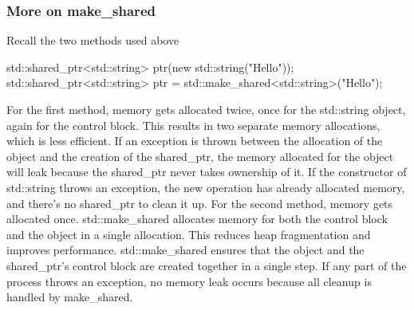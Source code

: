 \documentclass{report}
\begin{document}
\bigbreak \noindent 
\subsubsection{More on make\_shared}
\bigbreak \noindent 
Recall the two methods used above 
\bigbreak \noindent 
\begin{cppcode}
std::shared_ptr<std::string> ptr(new std::string("Hello"));
std::shared_ptr<std::string> ptr = std::make_shared<std::string>("Hello");
\end{cppcode}
\bigbreak \noindent 
For the first method, memory gets allocated twice, once for the std::string object, again for the control block. This results in two separate memory allocations, which is less efficient.
\bigbreak \noindent 
If an exception is thrown between the allocation of the object and the creation of the shared\_ptr, the memory allocated for the object will leak because the shared\_ptr never takes ownership of it. If the constructor of std::string throws an exception, the new operation has already allocated memory, and there’s no shared\_ptr to clean it up.
\bigbreak \noindent 
For the second method, memory gets allocated once. std::make\_shared allocates memory for both the control block and the object in a single allocation. This reduces heap fragmentation and improves performance.
\bigbreak \noindent 
std::make\_shared ensures that the object and the shared\_ptr's control block are created together in a single step. If any part of the process throws an exception, no memory leak occurs because all cleanup is handled by make\_shared.

\bigbreak \noindent 
\end{document}
